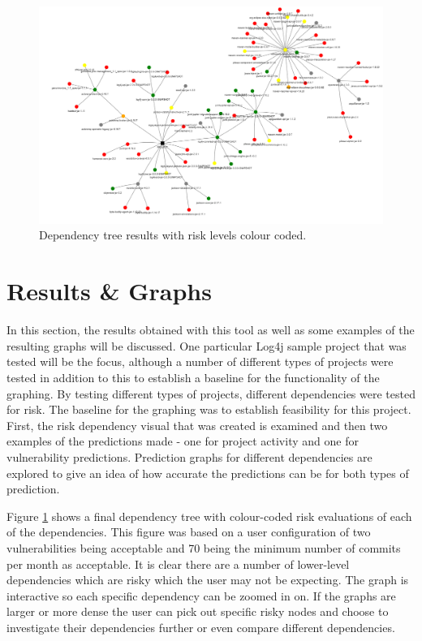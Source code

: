 \documentclass[conference]{IEEEtran}
\begin{document}
\begin{figure}
    \centering
    \includegraphics[scale=0.5]{dependency.png}
    \caption{Dependency tree results with risk levels colour coded.} 
    \label{fig:tree}
\end{figure}
\section{Results \& Graphs}

In this section, the results obtained with this tool as well as some examples of the resulting graphs will be discussed. One particular Log4j sample project \cite{noauthor_logging-log4j-sampleslog4j-server_nodate} that was tested will be the focus, although a number of different types of projects were tested in addition to this to establish a baseline for the functionality of the graphing. By testing different types of projects, different dependencies were tested for risk. The baseline for the graphing was to establish feasibility for this project. First, the risk dependency visual that was created is examined and then two examples of the predictions made - one for project activity and one for vulnerability predictions. Prediction graphs for different dependencies are explored to give an idea of how accurate the predictions can be for both types of prediction. 

Figure \ref{fig:tree} shows a final dependency tree with colour-coded risk evaluations of each of the dependencies. This figure was based on a user configuration of two vulnerabilities being acceptable and 70 being the minimum number of commits per month as acceptable. It is clear there are a number of lower-level dependencies which are risky which the user may not be expecting. The graph is interactive so each specific dependency can be zoomed in on. If the graphs are larger or more dense the user can pick out specific risky nodes and choose to investigate their dependencies further or even compare different dependencies. 
\end{document}

